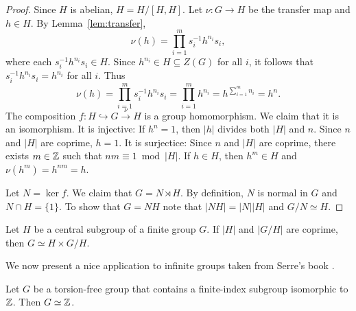 \begin{proof}
	Since $H$ is abelian, $H=H/[H,H]$. Let  
	$\nu\colon G\to H$ be the transfer map and $h\in H$. 
	By Lemma~\ref{lem:transfer}, 
	\[
		\nu(h)
		=\prod_{i=1}^m s_i^{-1}h^{n_i}s_i,
	\]
	where each $s_i^{-1}h^{n_i}s_i\in H$. Since 
	$h^{n_i}\in H\subseteq Z(G)$ for all $i$, it follows that 
	$s_i^{-1}h^{n_i}s_i=h^{n_i}$ for all $i$. Thus 
	\[
		\nu(h)
		=\prod_{i=1}^m s_i^{-1}h^{n_i}s_i
		=\prod_{i=1}^mh^{n_i}
		=h^{\sum_{i=1}^m n_i}=h^n.
	\] 
	The composition $f\colon H\hookrightarrow G\xrightarrow{\nu} H$ is a group homomorphism. 
	We claim that it is an isomorphism. It is injective: If $h^n=1$, then 
	$|h|$ divides both $|H|$ and $n$. Since $n$ and $|H|$ are
	coprime, $h=1$. It is surjectice: Since $n$ and $|H|$ are coprime, there exists 
	$m\in\mathbb{Z}$ such that $nm\equiv 1\bmod |H|$. If $h\in H$, then $h^m\in
	H$ and $\nu(h^m)=h^{nm}=h$. 
	
	Let $N=\ker f$. We claim that $G=N\rtimes H$. 
	By definition, $N$ is normal in $G$ and $N\cap
	H=\{1\}$. To show that $G=NH$ note that 
	$|NH|=|N||H|$ and $G/N\simeq H$.
\end{proof}

\begin{exercise}
	Let $H$ be a central subgroup of a finite group $G$. If $|H|$
	and $|G/H|$ are coprime, then $G\simeq H\times G/H$.
\end{exercise}



We now present a nice 
application to infinite groups taken from Serre's book 
\cite[7.12]{MR3469786}. 

\begin{theorem}
	Let $G$ be a torsion-free group that contains a finite-index subgroup isomorphic to  
	$\mathbb{Z}$. Then $G\simeq\mathbb{Z}$.
\end{theorem}

